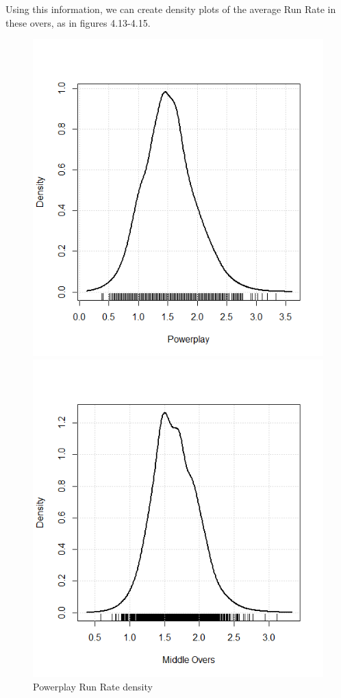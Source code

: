 Using this information, we can create density plots of the average Run Rate in these overs, as in figures 4.13-4.15. 

\begin{figure}
      \includegraphics[width=\linewidth]{figures/powerplaydens.png}
      \caption{Powerplay Run Rate density}
    \endminipage\hfill
      \includegraphics[width=\linewidth]{figures/middleoversdens.png}

\end{figure}
